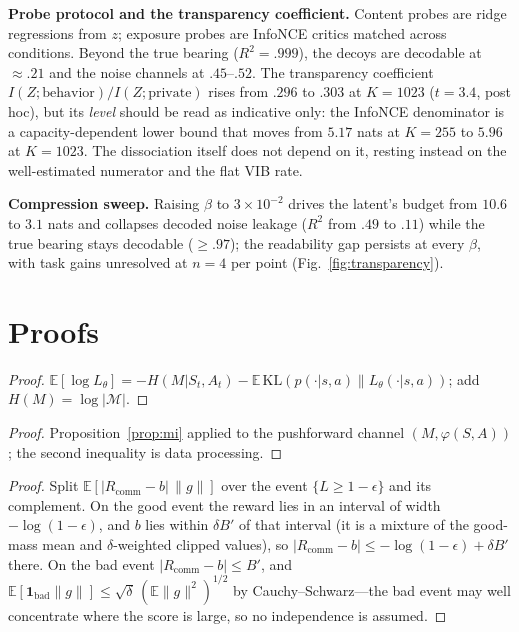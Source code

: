 \documentclass[sigconf,review,anonymous]{acmart}
\newcommand{\Rcomm}{R_{\text{comm}}}
\newcommand{\Ltheta}{L_\theta}
\begin{document}
\textbf{Probe protocol and the transparency coefficient.} Content probes are ridge regressions from $z$; exposure probes are InfoNCE critics matched across conditions. Beyond the true bearing ($R^2{=}.999$), the decoys are decodable at ${\approx}.21$ and the noise channels at $.45$--$.52$. The transparency coefficient $I(Z;\text{behavior})/I(Z;\text{private})$ rises from $.296$ to $.303$ at $K{=}1023$ ($t{=}3.4$, post hoc), but its \emph{level} should be read as indicative only: the InfoNCE denominator is a capacity-dependent lower bound that moves from $5.17$ nats at $K{=}255$ to $5.96$ at $K{=}1023$. The dissociation itself does not depend on it, resting instead on the well-estimated numerator and the flat VIB rate.

\textbf{Compression sweep.} Raising $\beta$ to $3{\times}10^{-2}$ drives the latent's budget from $10.6$ to $3.1$ nats and collapses decoded noise leakage ($R^2$ from $.49$ to $.11$) while the true bearing stays decodable ($\ge.97$); the readability gap persists at every $\beta$, with task gains unresolved at $n{=}4$ per point (Fig.~\ref{fig:transparency}).

\section{Proofs}
\label{app:proofs}

\begin{proof}
$\mathbb{E}[\log \Ltheta] = -H(M|S_t,A_t) - \mathbb{E}\,\mathrm{KL}(p(\cdot|s,a)\|\Ltheta(\cdot|s,a))$; add $H(M)=\log|\mathcal{M}|$.
\end{proof}

\begin{proof}
Proposition~\ref{prop:mi} applied to the pushforward channel $(M, \varphi(S,A))$; the second inequality is data processing.
\end{proof}

\begin{proof}
Split $\mathbb{E}[|\Rcomm - b|\,\|g\|]$ over the event $\{L \geq 1-\epsilon\}$ and its complement. On the good event the reward lies in an interval of width $-\log(1-\epsilon)$, and $b$ lies within $\delta B'$ of that interval (it is a mixture of the good-mass mean and $\delta$-weighted clipped values), so $|\Rcomm - b| \leq -\log(1-\epsilon) + \delta B'$ there. On the bad event $|\Rcomm - b| \leq B'$, and $\mathbb{E}[\mathbf{1}_{\text{bad}}\|g\|] \leq \sqrt{\delta}\,(\mathbb{E}\|g\|^2)^{1/2}$ by Cauchy--Schwarz---the bad event may well concentrate where the score is large, so no independence is assumed.
\end{proof}
\end{document}
